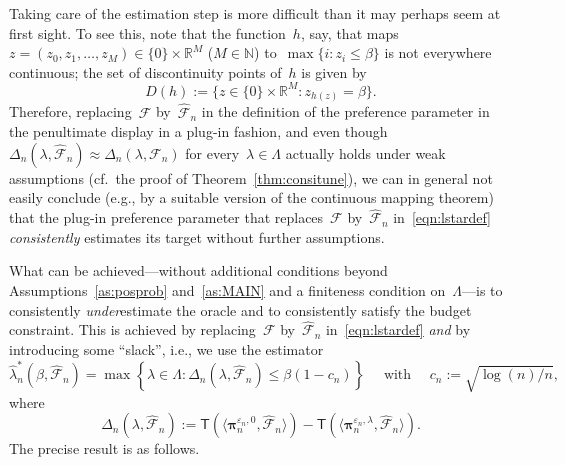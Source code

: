 \documentclass[11pt, a4paper]{article}
\newcommand{\N}{\mathbb{N}}
\newcommand{\R}{\mathbb{R}}
\theoremstyle{definition}
\begin{document}
Taking care of the estimation step is more difficult than it may perhaps seem at first sight. To see this, note that the function~$h$, say, that maps~$z = (z_0, z_1, \hdots, z_M) \in \{0\} \times \R^M$ ($M \in \N$) to~$\max\{i : z_i \leq \beta\}$ is not everywhere continuous; the set of discontinuity points of~$h$ is given by
\begin{equation}\label{eqn:disconth}
D(h) := \{z \in \{0\} \times \R^M: z_{h(z)} = \beta\}.
\end{equation}
Therefore, replacing~$\mathcal{F}$ by~$\hat{\mathcal{F}}_n$ in the definition of the preference parameter in the penultimate display in a plug-in fashion, and even though $\Delta_n(\lambda, \hat{\mathcal{F}}_n) \approx \Delta_n(\lambda, \mathcal{F}_n)$ for every~$\lambda \in \Lambda$ actually holds under weak assumptions (cf.~the proof of Theorem~\ref{thm:consitune}), we can in general not easily conclude (e.g., by a suitable version of the continuous mapping theorem) that the plug-in preference parameter that replaces~$\mathcal{F}$ by~$\hat{\mathcal{F}}_n$ in~\eqref{eqn:lstardef} \emph{consistently} estimates its target without further assumptions.


What can be achieved---without additional conditions beyond Assumptions~\ref{as:posprob} and~\ref{as:MAIN} and a finiteness condition on~$\Lambda$---is to consistently \emph{under}estimate the oracle and to consistently satisfy the budget constraint. This is achieved by replacing~$\mathcal{F}$ by~$\hat{\mathcal{F}}_n$ in~\eqref{eqn:lstardef} \emph{and} by introducing some ``slack'', i.e., we use the estimator \begin{equation}\label{eqn:preftune}
\hat{\lambda}_n^*(\beta, \hat{\mathcal{F}}_n) = \max \left\{\lambda \in \Lambda: \Delta_n(\lambda, \hat{\mathcal{F}}_n) \leq \beta (1-c_n)\right \} \quad \text{ with } \quad c_n := \sqrt{\log(n)/n},
\end{equation} where~$$\Delta_n(\lambda, \hat{\mathcal{F}}_n) := \mathsf{T}(\langle \bm{\pi}_{n}^{\varepsilon_n, 0}, \hat{\mathcal{F}}_n \rangle) - \mathsf{T}(\langle \bm{\pi}_{n}^{\varepsilon_n, \lambda}, \hat{\mathcal{F}}_n \rangle).$$ The precise result is as follows.
\end{document}
